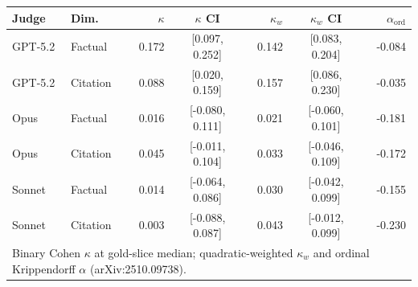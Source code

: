 \begin{tabular}{llrcrcr}
\toprule
Judge & Dim. & $\kappa$ & $\kappa$ CI & $\kappa_w$ & $\kappa_w$ CI & $\alpha_{\mathrm{ord}}$\\
\midrule
GPT-5.2 & Factual & 0.172 & [0.097, 0.252] & 0.142 & [0.083, 0.204] & -0.084 \\
GPT-5.2 & Citation & 0.088 & [0.020, 0.159] & 0.157 & [0.086, 0.230] & -0.035 \\
Opus & Factual & 0.016 & [-0.080, 0.111] & 0.021 & [-0.060, 0.101] & -0.181 \\
Opus & Citation & 0.045 & [-0.011, 0.104] & 0.033 & [-0.046, 0.109] & -0.172 \\
Sonnet & Factual & 0.014 & [-0.064, 0.086] & 0.030 & [-0.042, 0.099] & -0.155 \\
Sonnet & Citation & 0.003 & [-0.088, 0.087] & 0.043 & [-0.012, 0.099] & -0.230 \\
\bottomrule
\multicolumn{7}{l}{\footnotesize Binary Cohen $\kappa$ at gold-slice median; quadratic-weighted $\kappa_w$ and ordinal Krippendorff $\alpha$ (arXiv:2510.09738).} \\
\end{tabular}